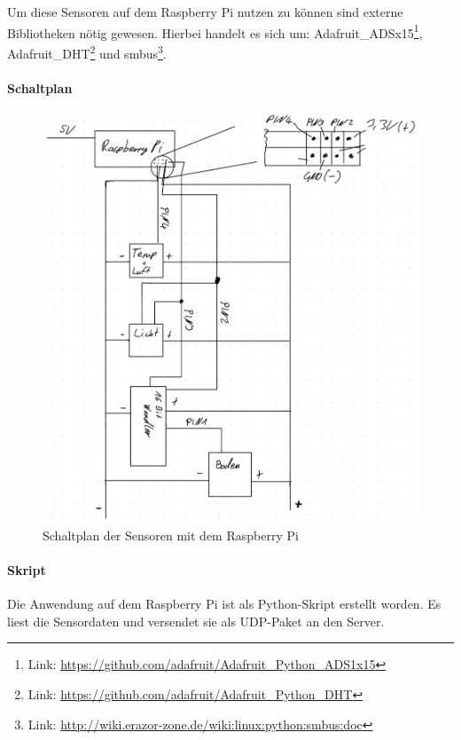 Um diese Sensoren auf dem Raspberry Pi nutzen zu können sind externe
Bibliotheken nötig gewesen. Hierbei handelt es sich um:
Adafruit\_ADSx15\footnote{Link:
  \url{https://github.com/adafruit/Adafruit_Python_ADS1x15}},
Adafruit\_DHT\footnote{Link:
  \url{https://github.com/adafruit/Adafruit_Python_DHT}} und
smbus\footnote{Link:
  \url{http://wiki.erazor-zone.de/wiki:linux:python:smbus:doc}}.

\hypertarget{schaltplan}{%
\paragraph{Schaltplan}\label{schaltplan}}

\begin{figure}
\centering
\includegraphics{img/schaltplan.png}
\caption{Schaltplan der Sensoren mit dem Raspberry Pi}
\end{figure}

\hypertarget{skript}{%
\paragraph{Skript}\label{skript}}

Die Anwendung auf dem Raspberry Pi ist als Python-Skript erstellt
worden. Es liest die Sensordaten und versendet sie als UDP-Paket an den
Server.

